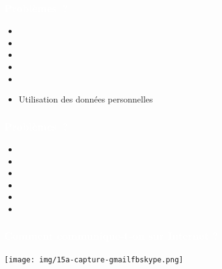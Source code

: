 \documentclass[notes=hide]{beamer}
\begin{document}
\begin{frame}
  \frametitle{\textcolor{white}{Problèmes~?}}
  \begin{itemize}
    \item
    \item
    \item
    \item
    \item
    \item Utilisation des données personnelles
  \end{itemize}
\end{frame}

\begin{frame}
  \frametitle{\textcolor{white}{Problèmes~?}}
  \begin{itemize}
    \item
    \item
    \item
    \item
    \item
    \item
  \end{itemize}
\end{frame}

\begin{frame}[t,plain]
\begin{center}
\vspace{\fill}
  \vspace{\fill}
\end{center}
\end{frame}

\begin{frame}[t,plain]
\begin{center}
\vspace{\fill}
  \vspace{\fill}
\end{center}
\end{frame}

\begin{frame}[t]
  \frametitle{\textcolor{white}{Comment communique-t-on sur Internet ?}}
\begin{center}
\vfill
\texttt{[image: img/15a-capture-gmailfbskype.png]}
\vfill
\end{center}
\end{frame}
\end{document}
